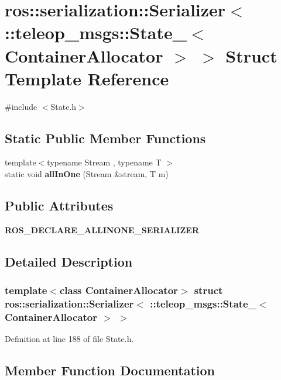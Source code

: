 \section{ros::serialization::Serializer$<$ ::teleop\_\-msgs::State\_\-$<$ ContainerAllocator $>$ $>$ Struct Template Reference}
\label{structros_1_1serialization_1_1Serializer_3_01_1_1teleop__msgs_1_1State___3_01ContainerAllocator_01_4_01_4}


{\ttfamily \#include $<$State.h$>$}

\subsection*{Static Public Member Functions}
\begin{DoxyCompactItemize}
\item 
{\footnotesize template$<$typename Stream , typename T $>$ }\\static void {\bf allInOne} (Stream \&stream, T m)
\end{DoxyCompactItemize}
\subsection*{Public Attributes}
\begin{DoxyCompactItemize}
\item 
{\bf ROS\_\-DECLARE\_\-ALLINONE\_\-SERIALIZER}
\end{DoxyCompactItemize}


\subsection{Detailed Description}
\subsubsection*{template$<$class ContainerAllocator$>$ struct ros::serialization::Serializer$<$ ::teleop\_\-msgs::State\_\-$<$ ContainerAllocator $>$ $>$}



Definition at line 188 of file State.h.



\subsection{Member Function Documentation}
